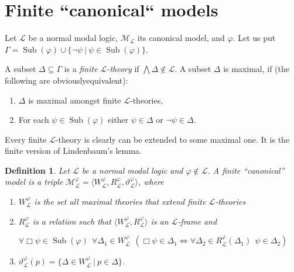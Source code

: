 \documentclass[a4paper]{article}
\theoremstyle{defin}
\newtheorem{defin}{Definition}
\theoremstyle{theorem}
\theoremstyle{prop}
\theoremstyle{lemma}
\theoremstyle{ex}
\theoremstyle{col}
\begin{document}
\section{Finite ``canonical`` models}

Let $\mathcal{L}$ be a normal modal logic, $\mathcal{M}_{\mathcal{L}}$ its canonical model, and $\varphi$. Let us put $\Gamma = \operatorname{Sub}(\varphi) \cup \{ \neg \psi \: | \: \psi \in \operatorname{Sub}(\varphi) \}$.

A subset $\Delta \subseteq \Gamma$ is a \emph{finite $\mathcal{L}$-theory} if $\bigwedge \Delta \notin \mathcal{L}$. A subset $\Delta$ is maximal, if (the following are obviouslyequivalent):
\begin{enumerate}
  \item $\Delta$ is maximal amongst finite $\mathcal{L}$-theories,
  \item For each $\psi \in \operatorname{Sub}(\varphi)$ either $\psi \in \Delta$ or
  $\neg \psi \in \Delta$.
\end{enumerate}

Every finite $\mathcal{L}$-theory is clearly can be extended to some maximal one. It is the finite version of Lindenbaum's lemma.

\begin{defin}
  Let $\mathcal{L}$ be a normal modal logic and $\varphi \not\in \mathcal{L}$. A finite ``canonical'' model is a triple $\mathcal{M}_{\mathcal{L}}^{\varphi} = \langle W_{\mathcal{L}}^{\varphi}, R_{\mathcal{L}}^{\varphi}, \vartheta_{\mathcal{L}}^{\varphi} \rangle$, where
  \begin{enumerate}
    \item $W_{\mathcal{L}}^{\varphi}$ is the set all maximal theories that extend finite $\mathcal{L}$-theories
    \item $R_{\mathcal{L}}^{\varphi}$ is a relation such that
    $\langle W_{\mathcal{L}}^{\varphi}, R_{\mathcal{L}}^{\varphi} \rangle$ is an $\mathcal{L}$-frame
    and
    \begin{center}
    $\forall \Box \psi \in \operatorname{Sub}(\varphi) \:\:
    \forall \Delta_1 \in W_{\mathcal{L}}^{\varphi} \:\: (\Box \psi \in \Delta_1 \Leftrightarrow
    \forall \Delta_2 \in R_{\mathcal{L}}^{\varphi}(\Delta_1) \:\: \psi \in \Delta_2)$
    \end{center}
    \item $\vartheta_{\mathcal{L}}^{\varphi}(p) = \{ \Delta \in W_{\mathcal{L}}^{\varphi} \: | \: p \in \Delta \}$.
  \end{enumerate}
\end{defin}
\end{document}

